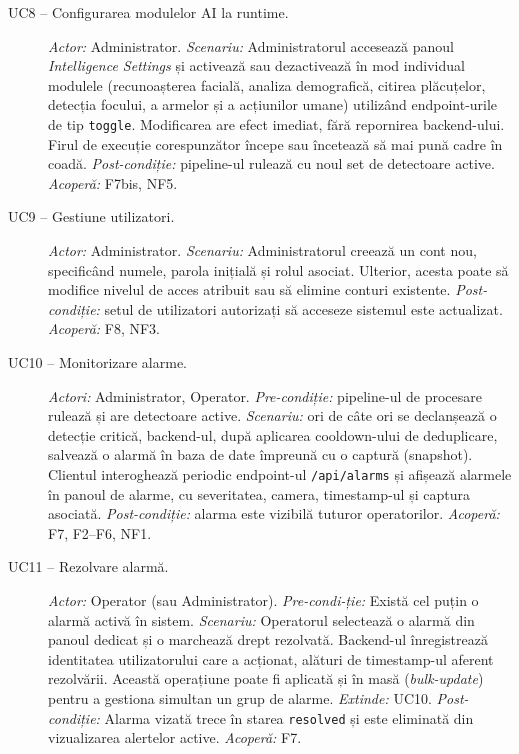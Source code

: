\documentclass[../../main.tex]{subfiles}
\begin{document}
\begin{description}
    \item[UC8 -- Configurarea modulelor AI la runtime.]  \textit{Actor:} Administrator. \textit{Scenariu:} Administratorul accesează panoul \emph{Intelligence Settings} și activează sau dezactivează în mod individual modulele (recunoașterea facială, analiza demografică, citirea plăcuțelor, detecția focului, a armelor și a acțiunilor umane) utilizând endpoint-urile de tip \texttt{toggle}. Modificarea are efect imediat, fără repornirea backend-ului. Firul de execuție corespunzător începe sau încetează să mai pună cadre în coadă. \textit{Post-condiție:} pipeline-ul rulează cu noul set de detectoare active. \textit{Acoperă:} F7bis, NF5.

    \item[UC9 -- Gestiune utilizatori.] \textit{Actor:} Administrator. \textit{Scenariu:} Administratorul creează un cont nou, specificând numele, parola inițială și rolul asociat. Ulterior, acesta poate să modifice nivelul de acces atribuit sau să elimine conturi existente. \textit{Post-condiție:} setul de utilizatori autorizați să acceseze sistemul este actualizat. \textit{Acoperă:} F8, NF3.

    \item[UC10 -- Monitorizare alarme.] \textit{Actori:} Administrator, Operator. \textit{Pre-condiție:} pipeline-ul de procesare rulează și are detectoare active. \textit{Scenariu:} ori de câte ori se declanșează o detecție critică, backend-ul, după aplicarea cooldown-ului de deduplicare, salvează o alarmă în baza de date împreună cu o captură (snapshot). Clientul interoghează periodic endpoint-ul \texttt{/api/alarms} și afișează alarmele în panoul de alarme, cu severitatea, camera, timestamp-ul și captura asociată. \textit{Post-condiție:} alarma este vizibilă tuturor operatorilor. \textit{Acoperă:} F7, F2--F6, NF1.

    \item[UC11 -- Rezolvare alarmă.] \textit{Actor:} Operator (sau Administrator). \textit{Pre-condi-ție:} Există cel puțin o alarmă activă în sistem. \textit{Scenariu:} Operatorul selectează o alarmă din panoul dedicat și o marchează drept rezolvată.  Backend-ul înregistrează identitatea utilizatorului care a acționat, alături de timestamp-ul aferent rezolvării. Această operațiune poate fi aplicată și în masă (\emph{bulk-update}) pentru a gestiona simultan un grup de alarme. \textit{Extinde:} UC10. \textit{Post-condiție:} Alarma vizată trece în starea \texttt{resolved} și este eliminată din vizualizarea alertelor active. \textit{Acoperă:} F7.


\end{description}
\end{document}
